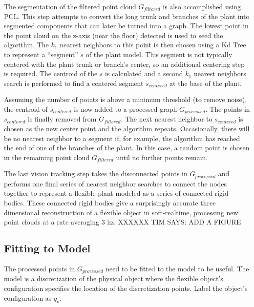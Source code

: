 \documentclass[runningheads,a4paper]{llncs}
\begin{document}
The segmentation of the filtered point cloud $G_{filtered}$ is also accomplished using PCL. This step attempts to convert the long trunk and branches of the plant into segmented components that can later be turned into a graph. The lowest point in the point cloud on the z-axis (near the floor) detected is used to seed the algorithm. The $k_1$ nearest neighbors to this point is then chosen using a Kd Tree to represent a “segment” $s$ of the plant model. This segment is not typically centered with the plant trunk or branch’s center, so an additional centering step is required. The centroid of the $s$ is calculated and a second $k_1$ nearest neighbors search is performed to find a centered segment $s_{centered}$ at the base of the plant.

Assuming the number of points is above a minimum threshold (to remove noise), the centroid of $s_{centered}$ is now added to a processed graph $G_{processed}$. The points in $s_{centered}$ is finally removed from $G_{filtered}$. The next nearest neighbor to $s_{centered}$ is chosen as the new center point and the algorithm repeats. Occasionally, there will be no nearest neighbor to a segment if, for example, the algorithm has reached the end of one of the branches of the plant. In this case, a random point is chosen in the remaining point cloud $G_{filtered}$ until no further points remain.

The last vision tracking step takes the disconnected points in $G_{processed}$ and performs one final series of nearest neighbor searches to connect the nodes together to represent a flexible plant modeled as a series of connected rigid bodies. These connected rigid bodies give a surprisingly accurate three dimensional reconstruction of a flexible object in soft-realtime, processing new point clouds at a rate averaging 3 hz. XXXXXX TIM SAYS: ADD A FIGURE

\subsection{Fitting to Model}

The processed points in $G_{processed}$ need to be fitted to the model to be useful. The model is a discretization of the physical object where the flexible object’s configuration specifies the location of the discretization points. Label the object’s configuration as $q_o$. 
\end{document}
